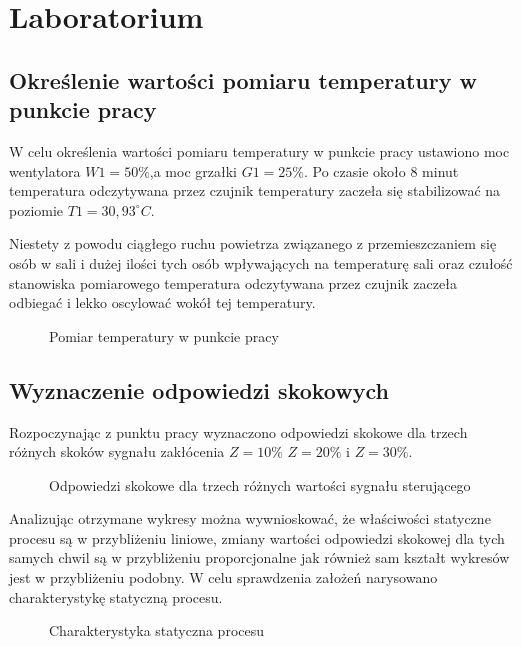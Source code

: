 \chapter{Laboratorium}

\section{Określenie wartości pomiaru temperatury w punkcie pracy}

W celu określenia wartości pomiaru temperatury w punkcie pracy ustawiono moc wentylatora  $W1 = 50\%$,a moc grzałki $G1 = 25\%$.
Po czasie około 8 minut temperatura odczytywana przez czujnik temperatury zaczeła się stabilizować  na poziomie  $T1 = 30,93^{\circ} C$.

Niestety z powodu ciągłego ruchu powietrza związanego z przemieszczaniem się osób w sali i dużej ilości tych osób wpływających na temperaturę sali oraz czułość stanowiska pomiarowego temperatura odczytywana przez czujnik zaczeła odbiegać i lekko oscylować wokół tej temperatury.

\begin{figure}[H]
\centering

\caption{Pomiar temperatury w punkcie pracy}
\end{figure}

\section{Wyznaczenie odpowiedzi skokowych}

Rozpoczynając z punktu pracy wyznaczono odpowiedzi skokowe dla trzech różnych skoków sygnału zakłócenia  $Z = 10\%$  $Z = 20\%$ i $Z = 30\%$.

\begin{figure}[H]
\centering

\caption{Odpowiedzi skokowe dla trzech różnych wartości sygnału sterującego}
\end{figure}

Analizując otrzymane wykresy można wywnioskować, że właściwości statyczne procesu są w przybliżeniu liniowe, zmiany wartości odpowiedzi skokowej dla tych samych chwil są w przybliżeniu proporcjonalne jak również sam kształt wykresów jest w przybliżeniu podobny. W celu sprawdzenia założeń narysowano charakterystykę statyczną procesu.

\begin{figure}[H]
\centering

\caption{Charakterystyka statyczna procesu}
\end{figure}

